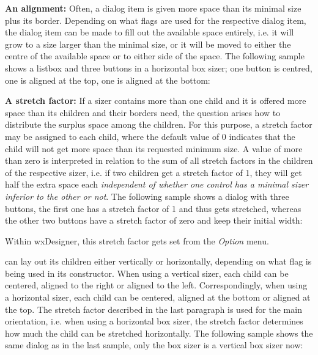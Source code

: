 \begin{center}
\gifsep
{}\gifsep
{}
\end{center}

{\bf An alignment:} Often, a dialog item is given more space than its minimal size
plus its border. Depending on what flags are used for the respective dialog
item, the dialog item can be made to fill out the available space entirely, i.e.
it will grow to a size larger than the minimal size, or it will be moved to either
the centre of the available space or to either side of the space. The following
sample shows a listbox and three buttons in a horizontal box sizer; one button
is centred, one is aligned at the top, one is aligned at the bottom:

\begin{center}
\end{center}

{\bf A stretch factor:} If a sizer contains more than one child and it is offered
more space than its children and their borders need, the question arises how to
distribute the surplus space among the children. For this purpose, a stretch
factor may be assigned to each child, where the default value of 0 indicates that the child
will not get more space than its requested minimum size. A value of more than zero
is interpreted in relation to the sum of all stretch factors in the children
of the respective sizer, i.e. if two children get a stretch factor of 1, they will
get half the extra space each {\it independent of whether one control has a minimal
sizer inferior to the other or not}. The following sample shows a dialog with
three buttons, the first one has a stretch factor of 1 and thus gets stretched,
whereas the other two buttons have a stretch factor of zero and keep their
initial width:

\begin{center}
\end{center}

Within wxDesigner, this stretch factor gets set from the {\it Option} menu.


 can lay out its children either vertically
or horizontally, depending on what flag is being used in its constructor.
When using a vertical sizer, each child can be centered, aligned to the
right or aligned to the left. Correspondingly, when using a horizontal
sizer, each child can be centered, aligned at the bottom or aligned at
the top. The stretch factor described in the last paragraph is used
for the main orientation, i.e. when using a horizontal box sizer, the
stretch factor determines how much the child can be stretched horizontally.
The following sample shows the same dialog as in the last sample,
only the box sizer is a vertical box sizer now:

